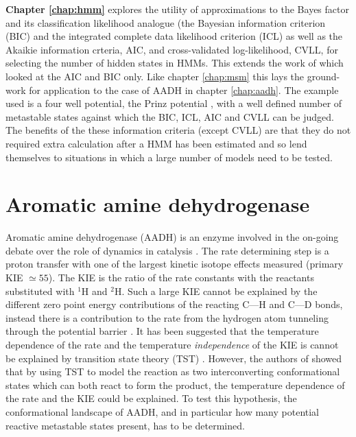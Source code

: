 \textbf{Chapter \ref{chap:hmm}} explores the utility of approximations to the Bayes factor and its classification likelihood analogue (the Bayesian information criterion (BIC) \cite{schwarzEstimatingDimensionModel1978a} and the integrated complete data likelihood criterion (ICL) \cite{biernackiAssessingMixtureModel2000a} as well as the Akaikie information crteria, AIC, \cite{akaikeInformationTheoryExtension1998} and cross-validated log-likelihood, CVLL, \cite{celeuxSelectingHiddenMarkov2008} for selecting the number of hidden states in HMMs. This extends the work of \cite{mcgibbonStatisticalModelSelection2014a} which looked at the AIC and BIC only. Like chapter \ref{chap:msm} this lays the ground-work for application to the case of AADH in chapter \ref{chap:aadh}. The example used is a four well potential, the Prinz potential \cite{prinzMarkovModelsMolecular2011}, with a well defined number of metastable states against which the BIC, ICL, AIC and CVLL can be judged. The benefits of the these information criteria (except CVLL) are that they do not required extra calculation after a HMM has been estimated and so lend themselves to situations in which a large number of models need to be tested. 

\section{Aromatic amine dehydrogenase}
Aromatic amine dehydrogenase (AADH) is an enzyme involved in the on-going debate over the role of dynamics in catalysis \cite{glowackiTakingOckhamRazor2012b}\cite{glowackiProteinDynamicsEnzyme2012a}\cite{mcgeaghProteinDynamicsEnzyme2011}. The rate determining step is a proton transfer with one of the largest kinetic isotope effects measured (primary KIE $\simeq 55$)\cite{masgrauTunnelingClassicalPaths2007}. The KIE is the ratio of the rate constants with the reactants substituted with $^1$H and $^{2}$H. Such a large KIE cannot be explained by the different zero point energy contributions of the reacting C---H and C---D bonds, instead there is a contribution to the rate from the hydrogen atom tunneling through the potential barrier \cite{masgrauTunnelingClassicalPaths2007}\cite{antoniouLargeKineticIsotope1997} \cite{basranImportanceBarrierShape2001a}\cite{sutcliffeHydrogenTunnellingEnzymecatalysed2006}. It has been suggested that the temperature dependence of the rate and the temperature \emph{independence} of the KIE is cannot be explained by transition state theory (TST) \cite{agrawalVibrationallyEnhancedHydrogen2004}\cite{kohenEnzymeCatalysisClassical1998}. However, the authors of \cite{glowackiProteinDynamicsEnzyme2012a} showed that by using TST to model the reaction as two interconverting conformational states which can both react to form the product, the temperature dependence of the rate and the KIE could be explained. To test this hypothesis, the conformational landscape of AADH, and in particular how many potential reactive metastable states present, has to be determined. 

